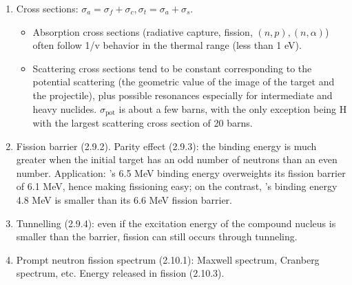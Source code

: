 \documentclass{school-22.211-notes}
\begin{document}
\begin{enumerate}
\begin{table}
    \caption{Main Reactions Undergone By Neutrons} \label{main-reactions}
  \end{table}
\item Cross sections: $\sigma_a = \sigma_f + \sigma_c, \sigma_t = \sigma_a + \sigma_s$. 
  \begin{itemize}
  \item Absorption cross sections (radiative capture, fission, $(n,p), (n,\alpha)$) often follow 1/v behavior in the thermal range (less than 1 eV). 
  \item Scattering cross sections tend to be constant corresponding to the potential scattering (the geometric value of the image of the target and the projectile), plus possible resonances especially for intermediate and heavy nuclides. $\sigma_{\mathrm{pot}}$ is about a few barns, with the only exception being H with the largest scattering cross section of 20 barns. 
  \end{itemize}
\item Fission barrier (2.9.2). Parity effect (2.9.3): the binding energy is much greater when the initial target has an odd number of neutrons than an even number. Application: 's 6.5 MeV binding energy overweights its fission barrier of 6.1 MeV, hence making fissioning easy; on the contrast, 's binding energy 4.8 MeV is smaller than its 6.6 MeV fission barrier. 
\item Tunnelling (2.9.4): even if the excitation energy of the compound nucleus is smaller than the barrier, fission can still occurs through tunneling. 
\item Prompt neutron fission spectrum (2.10.1): Maxwell spectrum, Cranberg spectrum, etc. Energy released in fission (2.10.3). 
\end{enumerate}
\end{document}
